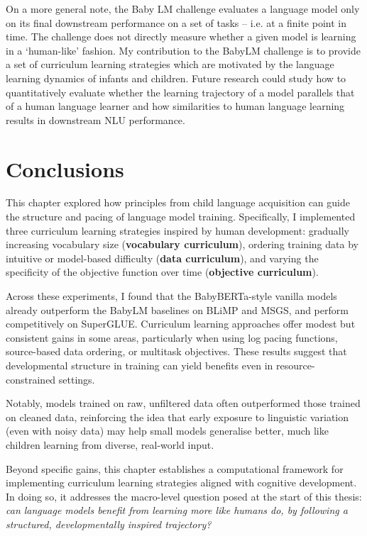 On a more general note, the Baby LM challenge evaluates a language model only on its final downstream performance on a set of tasks -- i.e. at a finite point in time. The challenge does not directly measure whether a given model is learning in a `human-like' fashion. My contribution to the BabyLM challenge is to provide a set of curriculum learning strategies which are motivated by the language learning dynamics of infants and children. Future research could study how to quantitatively evaluate whether the learning trajectory of a model parallels that of a human language learner and how similarities to human language learning results in downstream NLU performance. 


\section{Conclusions}

This chapter explored how principles from child language acquisition can guide the structure and pacing of language model training. Specifically, I implemented three curriculum learning strategies inspired by human development: gradually increasing vocabulary size (\textbf{vocabulary curriculum}), ordering training data by intuitive or model-based difficulty (\textbf{data curriculum}), and varying the specificity of the objective function over time (\textbf{objective curriculum}).

Across these experiments, I found that the BabyBERTa-style vanilla models already outperform the BabyLM baselines on BLiMP and MSGS, and perform competitively on SuperGLUE. Curriculum learning approaches offer modest but consistent gains in some areas, particularly when using log pacing functions, source-based data ordering, or multitask objectives. These results suggest that developmental structure in training can yield benefits even in resource-constrained settings.

Notably, models trained on raw, unfiltered data often outperformed those trained on cleaned data, reinforcing the idea that early exposure to linguistic variation (even with noisy data) may help small models generalise better, much like children learning from diverse, real-world input.

Beyond specific gains, this chapter establishes a computational framework for implementing curriculum learning strategies aligned with cognitive development. In doing so, it addresses the macro-level question posed at the start of this thesis: \textit{can language models benefit from learning more like humans do, by following a structured, developmentally inspired trajectory?} 

